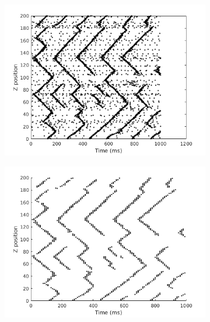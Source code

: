 \documentclass[a4paper,11pt]{article}
\begin{document}
\begin{figure}[!htb]
 \centering
 \begin{subfigure}{0.33\textwidth}
  \centering
  \includegraphics[width=\textwidth]{fig/2x2_firings}
 \end{subfigure}%
 \begin{subfigure}{0.33\textwidth}
  \centering
  \includegraphics[width=\textwidth]{fig/2x2_density_filter}
 \end{subfigure}%
 \begin{subfigure}{0.33\textwidth}
  \centering

\end{subfigure}
\end{figure}
\end{document}

